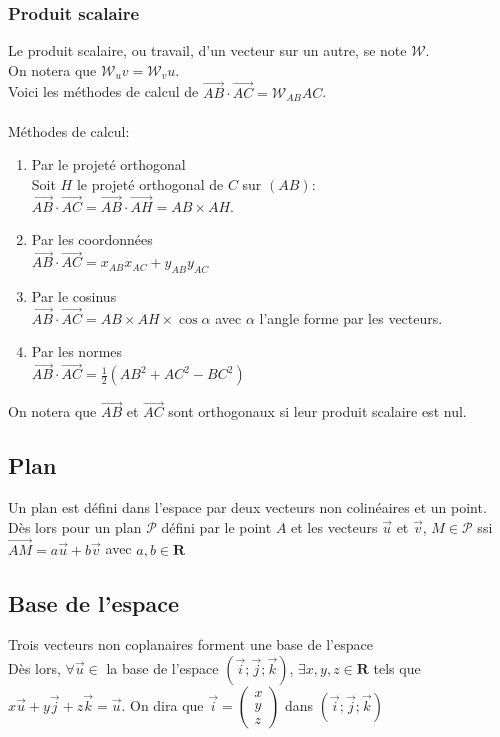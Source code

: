 \documentclass{article}
\begin{document}
\subsubsection{Produit scalaire}
    Le produit scalaire, ou travail, d'un vecteur sur un autre, se note $\mathcal{W}$.\\
    On notera que $\mathcal{W}_uv = \mathcal{W}_vu$.\\
    Voici les méthodes de calcul de $\Vec{AB} \cdot \Vec{AC} = \mathcal{W}_{AB}AC$.\\
    \\
    Méthodes de calcul:
    \begin{enumerate}
        \item Par le projeté orthogonal \\Soit $H$ le projeté orthogonal de $C$ sur $(AB)$: $\Vec{AB} \cdot \Vec{AC} = \Vec{AB} \cdot \Vec{AH} = AB \times AH$.
        \item Par les coordonnées \\$\Vec{AB} \cdot \Vec{AC} = x_{AB}x_{AC}+y_{AB}y_{AC}$
        \item Par le cosinus \\$\Vec{AB} \cdot \Vec{AC} = AB\times AH\times \cos \alpha$ avec $\alpha$ l'angle forme par les vecteurs.
        \item Par les normes \\$\Vec{AB} \cdot \Vec{AC} = \frac{1}{2}(AB^2 + AC^2 - BC^2)$
    \end{enumerate}
    On notera que $\Vec{AB}$ et $\Vec{AC}$ sont orthogonaux si leur produit scalaire est nul.


\subsection{Plan}
    Un plan est défini dans l'espace par deux vecteurs non colinéaires et un point.\\
    Dès lors pour un plan $\mathcal{P}$ défini par le point $A$ et les vecteurs $\Vec{u}$ et $\Vec{v}$, $M \in \mathcal{P}$ ssi $\Vec{AM} = a\Vec{u}+b\Vec{v}$ avec $a,b\in\mathbf{R}$

\subsection{Base de l'espace}
    Trois vecteurs non coplanaires forment une base de l'espace\\
    Dès lors, $\forall \Vec{u} \in$ la base de l'espace $(\Vec{i};\Vec{j};\Vec{k})$, $\exists x,y,z \in \mathbf{R}$ tels que $x\Vec{u}+y\Vec{j}+z\Vec{k}=\Vec{u}$. On dira que $\Vec{i} = \begin{pmatrix}x\\y\\z\end{pmatrix}$ dans $(\Vec{i};\Vec{j};\Vec{k})$
\end{document}
